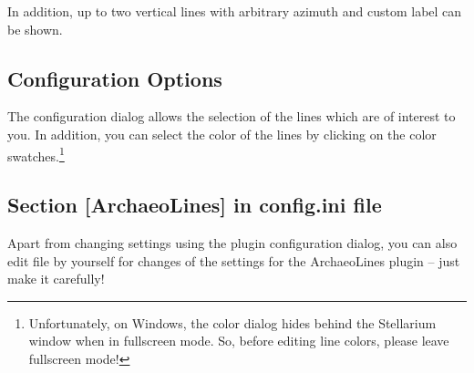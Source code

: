 In addition, up to two vertical lines with arbitrary azimuth and
custom label can be shown.


\subsection{Configuration Options}
\label{sec:plugin:ArchaeoLines:configuration}

The configuration dialog allows the selection of the lines which are
of interest to you. 
%
%
In addition, you can select the color of the lines by clicking on the
color swatches.\footnote{Unfortunately, on Windows, the color dialog hides
behind the Stellarium window when in fullscreen mode. So, before
editing line colors, please leave fullscreen mode!}

\subsection*{Section [ArchaeoLines] in config.ini file}

Apart from changing settings using the plugin configuration dialog,
you can also edit  file by yourself for changes of the
settings for the ArchaeoLines plugin -- just make it carefully!

